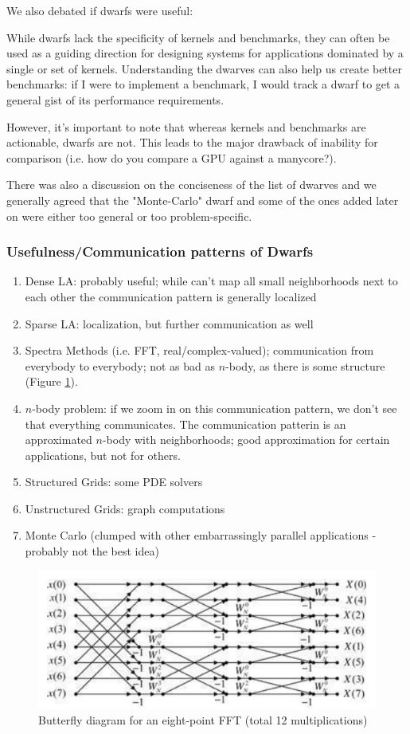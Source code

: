 We also debated if dwarfs were useful:

While dwarfs lack the specificity of kernels and benchmarks, they can often be used as a guiding direction for designing systems for applications dominated by a single or set of kernels. Understanding the dwarves can also help us create better benchmarks: if I were to implement a benchmark, I would track a dwarf to get a general gist of its performance requirements.

However, it's important to note that whereas kernels and benchmarks are actionable, dwarfs are not. This leads to the major drawback of inability for comparison (i.e. how do you compare a GPU against a manycore?).

There was also a discussion on the conciseness of the list of dwarves and we generally agreed that the "Monte-Carlo" dwarf and some of the ones added later on were either too general or too problem-specific.

\subsubsection{Usefulness/Communication patterns of Dwarfs}

\begin{enumerate}
    \item Dense LA: probably useful; while can't map all small neighborhoods next to each other the communication pattern is generally localized
    \item Sparse LA: localization, but further communication as well
    \item Spectra Methods (i.e. FFT, real/complex-valued); communication from everybody to everybody; not as bad as \( n \)-body, as there is some structure (Figure \ref{fig:butterfly}).
    \item \( n \)-body problem: if we zoom in on this communication pattern, we don't see that everything communicates. The communication patterin is an approximated \( n \)-body with neighborhoods; good approximation for certain applications, but not for others.
    \item Structured Grids: some PDE solvers
    \item Unstructured Grids: graph computations
    \item Monte Carlo (clumped with other embarrassingly parallel applications - probably not the best idea)
\end{enumerate}

\begin{figure}
    \centering
    \includegraphics[width = 0.8\linewidth]{butterfly}
    \caption{Butterfly diagram for an eight-point FFT (total 12 multiplications) \cite{DSP_Tan}}
    \label{fig:butterfly}
\end{figure}

{}



